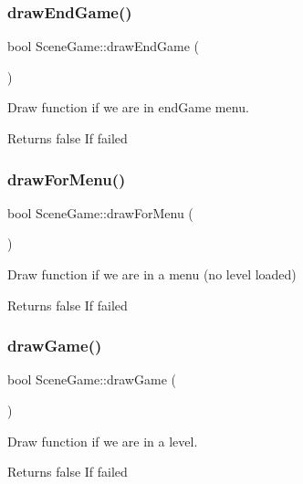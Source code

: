 \subsubsection{\texorpdfstring{draw\+End\+Game()}{drawEndGame()}}
{\footnotesize\ttfamily bool Scene\+Game\+::draw\+End\+Game (\begin{DoxyParamCaption}{ }\end{DoxyParamCaption})}



Draw function if we are in end\+Game menu. 

\begin{DoxyReturn}{Returns}
false If failed 
\end{DoxyReturn}
\mbox{\label{class_scene_game_acf0d5bdff0bc5393f284ae9dc4898152}} 
\subsubsection{\texorpdfstring{draw\+For\+Menu()}{drawForMenu()}}
{\footnotesize\ttfamily bool Scene\+Game\+::draw\+For\+Menu (\begin{DoxyParamCaption}{ }\end{DoxyParamCaption})}



Draw function if we are in a menu (no level loaded) 

\begin{DoxyReturn}{Returns}
false If failed 
\end{DoxyReturn}
\mbox{\label{class_scene_game_aa5a77510343519b344cda44acc320bcb}} 
\subsubsection{\texorpdfstring{draw\+Game()}{drawGame()}}
{\footnotesize\ttfamily bool Scene\+Game\+::draw\+Game (\begin{DoxyParamCaption}{ }\end{DoxyParamCaption})}



Draw function if we are in a level. 

\begin{DoxyReturn}{Returns}
false If failed 
\end{DoxyReturn}
\mbox{\label{class_scene_game_a5fef0afce5075031148f849b067dfe0a}} 
